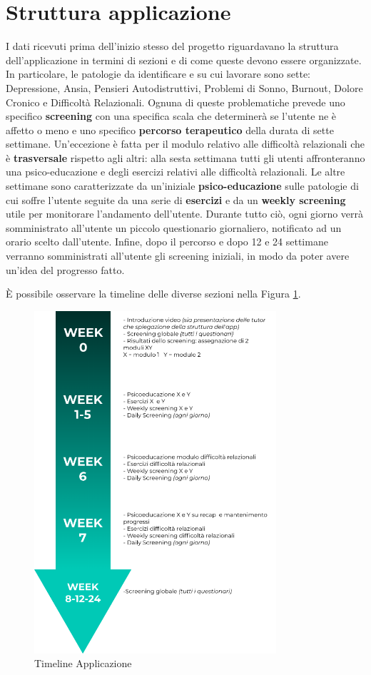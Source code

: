 \section{Struttura applicazione}
I dati ricevuti prima dell'inizio stesso del progetto riguardavano la struttura dell'applicazione in termini di sezioni e di come queste devono essere organizzate. In particolare, le patologie da identificare e su cui lavorare sono sette: Depressione, Ansia, Pensieri Autodistruttivi, Problemi di Sonno, Burnout, Dolore Cronico e Difficoltà Relazionali. Ognuna di queste problematiche prevede uno specifico \textbf{screening} con una specifica scala che determinerà se l'utente ne è affetto o meno e uno specifico \textbf{percorso terapeutico} della durata di sette settimane. Un'eccezione è fatta per il modulo relativo alle difficoltà relazionali che è \textbf{trasversale} rispetto agli altri: alla sesta settimana tutti gli utenti affronteranno una psico-educazione e degli esercizi relativi alle difficoltà relazionali. Le altre settimane sono caratterizzate da un'iniziale \textbf{psico-educazione} sulle patologie di cui soffre l'utente seguite da una serie di \textbf{esercizi} e da un \textbf{weekly screening} utile per monitorare l'andamento dell'utente. Durante tutto ciò, ogni giorno verrà somministrato all'utente un piccolo questionario giornaliero, notificato ad un orario scelto dall'utente.
Infine, dopo il percorso e dopo 12 e 24 settimane verranno somministrati all'utente gli screening iniziali, in modo da poter avere un'idea del progresso fatto.

È possibile osservare la timeline delle diverse sezioni nella Figura \ref{fig:timeline_app}.

\begin{figure}
\centering
\includegraphics[width=0.8\textwidth]{img/timeline_app}
\caption{Timeline Applicazione}
\label{fig:timeline_app}
\end{figure}

